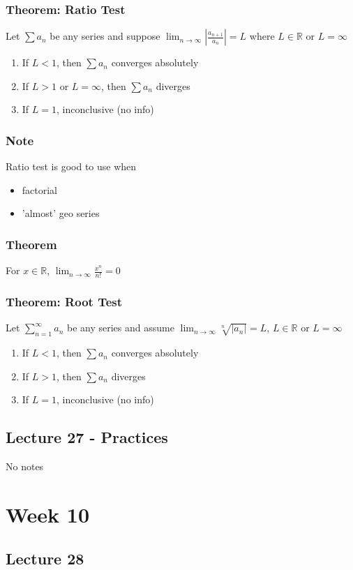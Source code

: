 \documentclass[12pt, letterpaper]{article}
\begin{document}
\subsubsection{Theorem: Ratio Test}
Let $\sum a_n$ be any series and suppose $\displaystyle\lim_{n\to\infty}|\frac{a_{n+1}}{a_n}| = L$ where $L\in\mathbb{R}$ or $L=\infty$ 
\begin{enumerate}
    \item If $L<1$, then $\sum a_n$ converges absolutely
    \item If $L>1$ or $L=\infty$, then $\sum a_n$ diverges 
    \item If $L=1$, inconclusive (no info)
\end{enumerate}
\subsubsection*{Note}
Ratio test is good to use when 
\begin{itemize}
    \item factorial 
    \item 'almost' geo series
\end{itemize}
\subsubsection{Theorem}
For $x\in\mathbb{R}$, $\displaystyle\lim_{n\to\infty}\frac{x^n}{n!} = 0$
\subsubsection{Theorem: Root Test}
Let $\displaystyle\sum_{n=1}^{\infty}a_n$ be any series and assume $\displaystyle\lim_{n\to\infty}\sqrt[n]{|a_n|} = L$, $L\in\mathbb{R}$ or $L=\infty$
\begin{enumerate}
    \item If $L<1$, then $\sum a_n$ converges absolutely
    \item If $L>1$, then $\sum a_n$ diverges 
    \item If $L=1$, inconclusive (no info)
\end{enumerate}
\subsection{Lecture 27 - Practices}
No notes

\section{Week 10} 
\subsection{Lecture 28}
\end{document}
